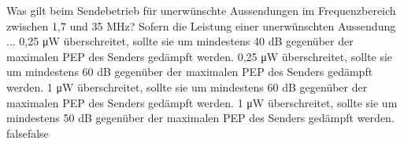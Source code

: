     {Was gilt beim Sendebetrieb für unerwünschte Aussendungen im Frequenzbereich zwischen 1,7 und 35 MHz? Sofern die Leistung einer unerwünschten Aussendung ...}
    {0,25 \si{\micro\watt} überschreitet, sollte sie um mindestens 40 dB gegenüber der maximalen PEP des Senders gedämpft werden.}
    {0,25 \si{\micro\watt} überschreitet, sollte sie um mindestens 60 dB gegenüber der maximalen PEP des Senders gedämpft werden.}
    {1 \si{\micro\watt} überschreitet, sollte sie um mindestens 60 dB gegenüber der maximalen PEP des Senders gedämpft werden.}
    {1 \si{\micro\watt} überschreitet, sollte sie um mindestens 50 dB gegenüber der maximalen PEP des Senders gedämpft werden.}
    {false}{false}